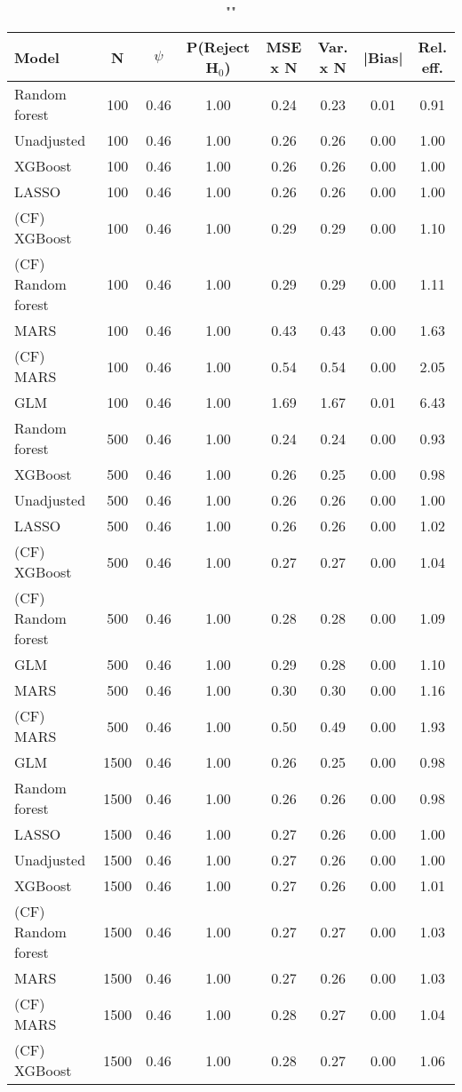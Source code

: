\begin{table}
\centering
\caption{""}
\begin{tabular}{lccccccc}
\toprule
Model & N & $\psi$ & P(Reject H$_0$) & MSE x N & Var. x N & |Bias| & Rel. eff.\\ \midrule
Random forest & 100 & 0.46 & 1.00 & 0.24 & 0.23 & 0.01 & 0.91 \\ 
Unadjusted & 100 & 0.46 & 1.00 & 0.26 & 0.26 & 0.00 & 1.00 \\ 
XGBoost & 100 & 0.46 & 1.00 & 0.26 & 0.26 & 0.00 & 1.00 \\ 
LASSO & 100 & 0.46 & 1.00 & 0.26 & 0.26 & 0.00 & 1.00 \\ 
(CF) XGBoost & 100 & 0.46 & 1.00 & 0.29 & 0.29 & 0.00 & 1.10 \\ 
(CF) Random forest & 100 & 0.46 & 1.00 & 0.29 & 0.29 & 0.00 & 1.11 \\ 
MARS & 100 & 0.46 & 1.00 & 0.43 & 0.43 & 0.00 & 1.63 \\ 
(CF) MARS & 100 & 0.46 & 1.00 & 0.54 & 0.54 & 0.00 & 2.05 \\ 
GLM & 100 & 0.46 & 1.00 & 1.69 & 1.67 & 0.01 & 6.43 \\ \addlinespace 
Random forest & 500 & 0.46 & 1.00 & 0.24 & 0.24 & 0.00 & 0.93 \\ 
XGBoost & 500 & 0.46 & 1.00 & 0.26 & 0.25 & 0.00 & 0.98 \\ 
Unadjusted & 500 & 0.46 & 1.00 & 0.26 & 0.26 & 0.00 & 1.00 \\ 
LASSO & 500 & 0.46 & 1.00 & 0.26 & 0.26 & 0.00 & 1.02 \\ 
(CF) XGBoost & 500 & 0.46 & 1.00 & 0.27 & 0.27 & 0.00 & 1.04 \\ 
(CF) Random forest & 500 & 0.46 & 1.00 & 0.28 & 0.28 & 0.00 & 1.09 \\ 
GLM & 500 & 0.46 & 1.00 & 0.29 & 0.28 & 0.00 & 1.10 \\ 
MARS & 500 & 0.46 & 1.00 & 0.30 & 0.30 & 0.00 & 1.16 \\ 
(CF) MARS & 500 & 0.46 & 1.00 & 0.50 & 0.49 & 0.00 & 1.93 \\ \addlinespace 
GLM & 1500 & 0.46 & 1.00 & 0.26 & 0.25 & 0.00 & 0.98 \\ 
Random forest & 1500 & 0.46 & 1.00 & 0.26 & 0.26 & 0.00 & 0.98 \\ 
LASSO & 1500 & 0.46 & 1.00 & 0.27 & 0.26 & 0.00 & 1.00 \\ 
Unadjusted & 1500 & 0.46 & 1.00 & 0.27 & 0.26 & 0.00 & 1.00 \\ 
XGBoost & 1500 & 0.46 & 1.00 & 0.27 & 0.26 & 0.00 & 1.01 \\ 
(CF) Random forest & 1500 & 0.46 & 1.00 & 0.27 & 0.27 & 0.00 & 1.03 \\ 
MARS & 1500 & 0.46 & 1.00 & 0.27 & 0.26 & 0.00 & 1.03 \\ 
(CF) MARS & 1500 & 0.46 & 1.00 & 0.28 & 0.27 & 0.00 & 1.04 \\ 
(CF) XGBoost & 1500 & 0.46 & 1.00 & 0.28 & 0.27 & 0.00 & 1.06 \\
\bottomrule
\end{tabular}
\end{table}
